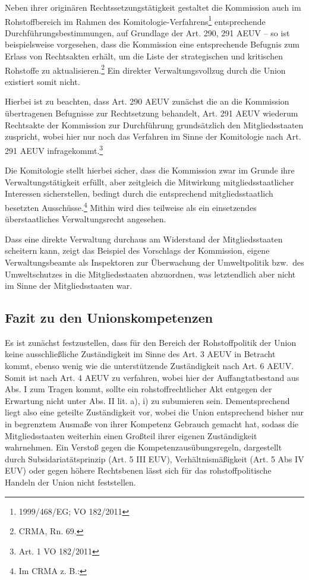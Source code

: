 \documentclass[12pt,a4paper,oneside]{book} %
\begin{document}
	Neben ihrer originären Rechtssetzungstätigkeit gestaltet die Kommission auch im Rohstoffbereich im Rahmen des Komitologie-Verfahrens\footnote{1999/468/EG; VO 182/2011} entsprechende Durchführungsbestimmungen, auf Grundlage der Art. 290, 291 AEUV -- so ist beispielsweise vorgesehen, dass die Kommission eine entsprechende Befugnis zum Erlass von Rechtsakten erhält, um die Liste der strategischen und kritischen Rohstoffe zu aktualisieren.\footnote{CRMA, Rn. 69.} Ein direkter Verwaltungsvollzug durch die Union existiert somit nicht. 
	
	Hierbei ist zu beachten, dass Art. 290 AEUV zunächst die an die Kommission übertragenen Befugnisse zur Rechtsetzung behandelt, Art. 291 AEUV wiederum Rechtsakte der Kommission zur Durchführung grundsätzlich den Mitgliedsstaaten zuspricht, wobei hier nur noch das Verfahren im Sinne der Komitologie nach Art. 291 AEUV infragekommt.\footnote{Art. 1 VO 182/2011}
	
	Die Komitologie stellt hierbei sicher, dass die Kommission zwar im Grunde ihre Verwaltungstätigkeit erfüllt, aber zeitgleich die Mitwirkung mitgliedsstaatlicher Interessen sicherstellen, bedingt durch die entsprechend mitgliedsstaatlich besetzten Ausschüsse.\footnote{Im CRMA z. B.: }%
	Mithin wird dies teilweise als ein einsetzendes überstaatliches Verwaltungsrecht angesehen.\autocite{von Sydow, Verwaltungskooperation S. 80 ff.}
	
	Dass eine direkte Verwaltung durchaus am Widerstand der Mitgliedsstaaten scheitern kann, zeigt das Beispiel des Vorschlags der Kommission, eigene Verwaltungsbeamte als Inspektoren zur Überwachung der Umweltpolitik bzw.\, des Umweltschutzes in die Mitgliedsstaaten abzuordnen, was letztendlich aber nicht im Sinne der Mitgliedsstaaten war.\autocite{Dauses/Ludwigs, O. Umweltpolitik, Rn. 226}
	
	\subsection{Fazit zu den Unionskompetenzen}
	Es ist zunächst festzustellen, dass für den Bereich der Rohstoffpolitik der Union keine ausschließliche Zuständigkeit im Sinne des Art. 3 AEUV in Betracht kommt, ebenso wenig wie die unterstützende Zuständigkeit nach Art. 6 AEUV. Somit ist nach Art. 4 AEUV zu verfahren, wobei hier der Auffangtatbestand aus Abs. I zum Tragen kommt, sollte ein rohstoffrechtlicher Akt entgegen der Erwartung nicht unter Abs. II lit. a), i) zu subumieren sein. Dementsprechend liegt also eine geteilte Zuständigkeit vor, wobei die Union entsprechend bisher nur in begrenztem Ausmaße von ihrer Kompetenz Gebrauch gemacht hat, sodass die Mitgliedsstaaten weiterhin einen Großteil ihrer eigenen Zuständigkeit wahrnehmen. Ein Verstoß gegen die Kompetenzausübungsregeln, dargestellt durch Subsidariatätsprinzip (Art. 5 III EUV), Verhältnismäßigkeit (Art. 5 Abs IV EUV) oder gegen höhere Rechtsbenen lässt sich für das rohstoffpolitische Handeln der Union nicht feststellen.
	
\end{document}
